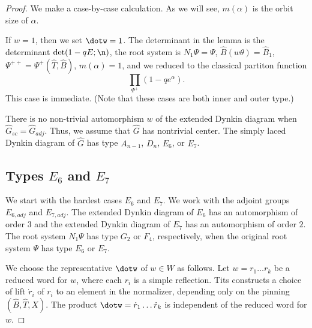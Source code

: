 \begin{proof} 
  We make a case-by-case calculation.  As we will see, $m(\alpha)$ is
  the orbit size of $\alpha$.

  If $w=1$, then we set $\dotw=1$.  The determinant in the lemma is
  the determinant $\det(1- q E;\n)$, the root system is $N_1\Psi
  =\Psi$, $\hat B(w\theta)=\hat B_1$, $\Psi^{++}=\Psi^+(\hat T,\hat B)$,
$m(\alpha)=1$, and we reduced to the classical partiton function
\[
\prod_{\Psi^+}(1-q e^\alpha).
\]
 This case is immediate.  (Note that these
  cases are both inner and outer type.)

  There is no non-trivial automorphism $w$ of the extended Dynkin
  diagram when $\hat G_{sc} = \hat G_{adj}$.  Thus, we assume that
  $\hat G$ has nontrivial center.  The simply laced Dynkin diagram of
  $\hat G$ has type $A_{n-1}$, $D_n$, $E_6$, or $E_7$.

\subsection{Types $E_6$ and $E_7$}
  We start with the hardest cases $E_6$ and $E_7$.  We work with the adjoint
  groups $E_{6,adj}$ and $E_{7,adj}$.  The extended
  Dynkin diagram of $E_6$ has an automorphism of order $3$ and the
  extended Dynkin diagram of $E_7$ has an automorphism of order $2$.
  The root system $N_1\Psi$ has type $G_2$ or $F_4$, respectively,
  when the original root system $\Psi$ has type $E_6$ or $E_7$.

  We choose the representative $\dotw$ of $w\in W$ as follows.  Let
  $w=r_1\ldots r_k$ be a reduced word for $w$, where each $r_i$ is a
  simple reflection.  Tits constructs a choice of lift $\dot r_i$ of
  $r_i$ to an element in the normalizer, depending only on the pinning
  $(\hat B,\hat T,X)$.  The product $\dotw = \dot r_1\ldots \dot r_k$
  is independent of the reduced word for $w$.


\end{proof}

